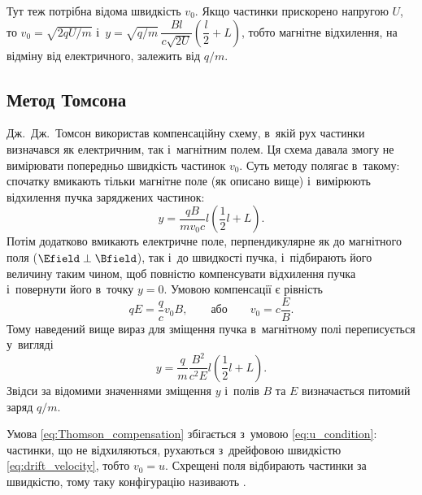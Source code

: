 Тут теж потрібна відома швидкість $v_0$. Якщо частинки прискорено напругою $U$, то $v_0 = \sqrt{2qU/m}$ і~$y = \sqrt{q/m}\,\dfrac{Bl}{c\sqrt{2U}}\left(\dfrac{l}{2} + L\right)$, тобто магнітне відхилення, на відміну від електричного, залежить від $q/m$.


\subsection*{Метод Томсона}


Дж.~Дж.~Томсон використав компенсаційну схему, в~якій рух частинки визначався як електричним, так і~магнітним полем. Ця схема давала змогу не вимірювати попередньо швидкість частинок $v_0$. Суть методу полягає в~такому: спочатку вмикають тільки магнітне поле (як описано вище) і~вимірюють відхилення пучка заряджених частинок:
\begin{equation}\label{eq:Thomson_B}
	y = \frac{qB}{mv_0 c}l\left(\frac{1}{2}l + L\right).
\end{equation}
Потім додатково вмикають електричне поле, перпендикулярне як до магнітного поля ($\Efield \perp \Bfield$), так і~до швидкості пучка, і~підбирають його величину таким чином, щоб повністю компенсувати відхилення пучка і~повернути його в~точку $y = 0$. Умовою компенсації є рівність
\begin{equation}\label{eq:Thomson_compensation}
	qE = \frac{q}{c}v_0 B, \qquad \text{або} \qquad v_0 = c\frac{E}{B}.
\end{equation}
Тому наведений вище вираз для зміщення пучка в~магнітному полі переписується у~вигляді
\begin{equation}\label{eq:Thomson_y}
	y = \frac{q}{m}\frac{B^2}{c^2 E}l\left(\frac{1}{2}l + L\right).
\end{equation}
Звідси за відомими значеннями зміщення $y$ і~полів $B$ та $E$ визначається питомий заряд $q/m$.

Умова \eqref{eq:Thomson_compensation} збігається з~умовою \eqref{eq:u_condition}: частинки, що не відхиляються, рухаються з~дрейфовою швидкістю \eqref{eq:drift_velocity}, тобто $v_0 = u$. Схрещені поля відбирають частинки за швидкістю, тому таку конфігурацію називають .

